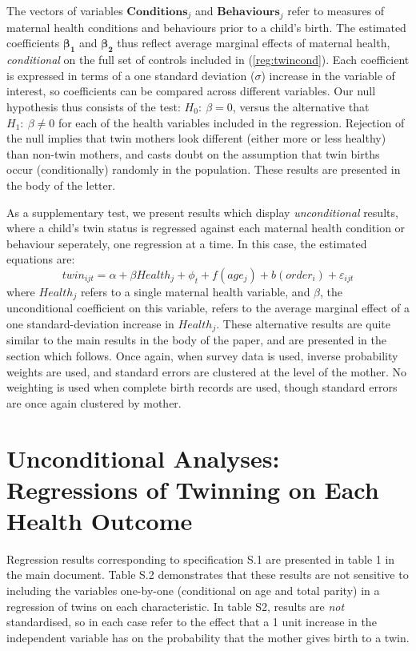 \documentclass{nature}
\begin{document}
\begin{linenumbers}
The vectors of variables $\bm{Conditions}_j$ and $\bm{Behaviours}_j$ refer to measures of maternal health conditions and behaviours prior to a child's birth.  The estimated coefficients $\bm{\beta_1}$ and $\bm{\beta_2}$ thus reflect average marginal effects of maternal health, \emph{conditional} on the full set of controls included in (\ref{reg:twincond}).  Each coefficient is expressed in terms of a one standard deviation ($\sigma$) increase in the variable of interest, so coefficients can be compared across different variables.  Our null hypothesis thus consists of the test: $H_0:\ \beta=0$, versus the alternative that $H_1:\ \beta\neq 0$ for each of the health variables included in the regression. Rejection of the null implies that twin mothers look different (either more or less healthy) than non-twin mothers, and casts doubt on the assumption that twin births occur (conditionally) randomly in the population.  These results are presented in the body of the letter.  

As a supplementary test, we present results which display \emph{unconditional} results, where a child's twin status is regressed against each maternal health condition or behaviour seperately, one regression at a time.  In this case, the estimated equations are:
\begin{equation}
twin_{ijt}=\alpha + \beta Health_j + \phi_t + f(age_j) + b(order_i) + \varepsilon_{ijt}
\end{equation}
where $Health_j$ refers to a single maternal health variable, and $\beta$, the unconditional coefficient on this variable, refers to the average marginal effect of a one standard-deviation increase in $Health_j$.  These alternative results are quite similar to the main results in the body of the paper, and are presented in the section which follows.  Once again, when survey data is used, inverse probability weights are used, and standard errors are clustered at the level of the mother.  No weighting is used when complete birth records are used, though standard errors are once again clustered by mother.

\section{Unconditional Analyses: Regressions of Twinning on Each Health Outcome}
Regression results corresponding to specification S.1 are presented in table 1 in the main document.  Table S.2 demonstrates that these results are not sensitive to including the variables one-by-one (conditional on age and total parity) in a regression of twins on each characteristic.  In table S2, results are \emph{not} standardised, so in each case refer to the effect that a 1 unit increase in the independent variable has on the probability that the mother gives birth to a twin.


\end{linenumbers}
\end{document}
